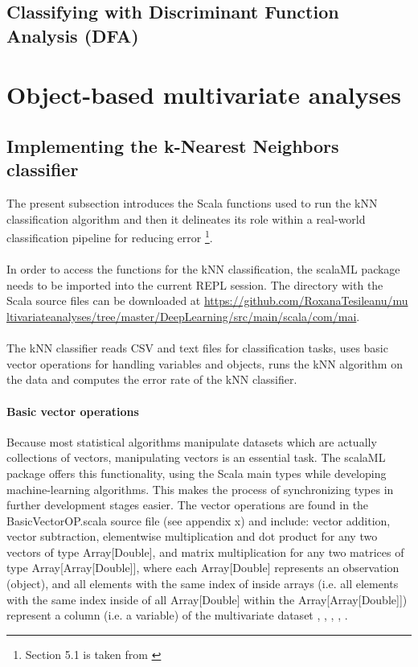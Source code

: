 \documentclass {article}
\begin{document}
\subsection {Classifying with Discriminant Function Analysis (DFA)}


\section {Object-based multivariate analyses}

\subsection{ Implementing the k-Nearest Neighbors classifier}

The present subsection introduces the Scala functions used to run the kNN classification algorithm and then it delineates its role within a real-world classification pipeline for reducing error \footnote {Section 5.1 is taken from \cite{tesileanu_introduction_2017}}.
\\
\\
In order to access the functions for the kNN classification, the scalaML package needs to be imported into the current REPL session. The directory with the Scala source files can be downloaded at \href{https://github.com/RoxanaTesileanu/multivariate_analyses/tree/master/DeepLearning/src/main/scala/com/mai}{https://github.com/RoxanaTesileanu/mu\\ltivariate\underline{\space}analyses/tree/master/DeepLearning/src/main/scala/com/mai}.
\\
\\
The kNN classifier reads CSV and text files for classification tasks, uses basic vector operations for handling variables and objects, runs the kNN algorithm on the data and computes the error rate of the kNN classifier.

\paragraph {Basic vector operations}

Because most statistical algorithms manipulate datasets which are actually collections of vectors, manipulating vectors is an essential task. The scalaML package offers this functionality, using the Scala main types while developing machine-learning algorithms. This makes the process of synchronizing types in further development stages easier.
 The vector operations are found in the BasicVectorOP.scala source file (see appendix x) and include: vector addition, vector subtraction, elementwise multiplication and dot product for any two vectors of type Array[Double], and matrix multiplication for any two matrices of type Array[Array[Double]], where each Array[Double] represents an observation (object), and all elements with the same index of inside arrays (i.e. all elements with the same index inside of all Array[Double] within the Array[Array[Double]]) represent a column (i.e. a variable) of the multivariate dataset \cite{dawkins_pauls_2005}, \cite{odersky_programming_2010}, \cite{swartz_learning_2015}, \cite{trask_grokking_2017}, \cite{epfl_scala_2017}.
\end{document}
